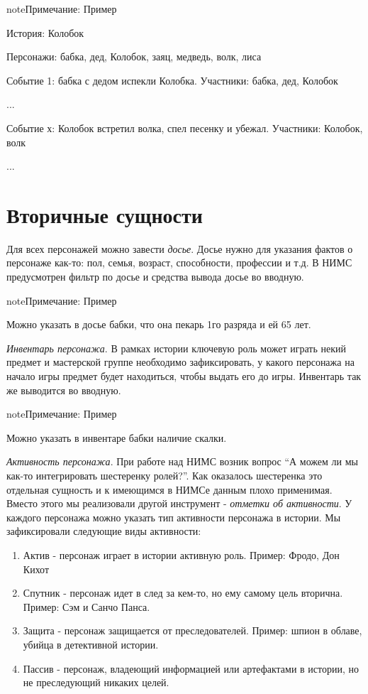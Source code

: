 \documentclass[a4paper,oneside,10pt,russian]{sphinxmanual}
\begin{document}
\begin{notice}{note}{Примечание:}
Пример

История: Колобок

Персонажи: бабка, дед, Колобок, заяц, медведь, волк, лиса

Событие 1: бабка с дедом испекли Колобка. Участники: бабка, дед, Колобок

...

Событие х: Колобок встретил волка, спел песенку и убежал. Участники: Колобок, волк

...
\end{notice}


\section{Вторичные сущности}
\label{theory:id3}\label{theory:secondary-entities-desc}
Для всех персонажей можно завести \emph{досье}. Досье нужно для указания фактов о персонаже как-то: пол, семья, возраст, способности, профессии и т.д. В НИМС предусмотрен фильтр по досье и средства вывода досье во вводную.

\begin{notice}{note}{Примечание:}
Пример

Можно указать в досье бабки, что она пекарь 1го разряда и ей 65 лет.
\end{notice}

\emph{Инвентарь персонажа}. В рамках истории ключевую роль может играть некий предмет и мастерской группе необходимо зафиксировать, у какого персонажа на начало игры предмет будет находиться, чтобы выдать его до игры. Инвентарь так же выводится во вводную.

\begin{notice}{note}{Примечание:}
Пример

Можно указать в инвентаре бабки наличие скалки.
\end{notice}

\emph{Активность персонажа}. При работе над НИМС возник вопрос ``А можем ли мы как-то интегрировать шестеренку ролей?''. Как оказалось шестеренка это отдельная сущность и к имеющимся в НИМСе данным плохо применимая. Вместо этого мы реализовали другой инструмент - \emph{отметки об активности}. У каждого персонажа можно указать тип активности персонажа в истории. Мы зафиксировали следующие виды активности:
\begin{enumerate}
\item {}
Актив - персонаж играет в истории активную роль. Пример: Фродо, Дон Кихот

\item {}
Спутник - персонаж идет в след за кем-то, но ему самому цель вторична. Пример: Сэм и Санчо Панса.

\item {}
Защита - персонаж защищается от преследователей. Пример: шпион в облаве, убийца в детективной истории.

\item {}
Пассив - персонаж, владеющий информацией или артефактами в истории, но не преследующий никаких целей.

\end{enumerate}
\end{document}
